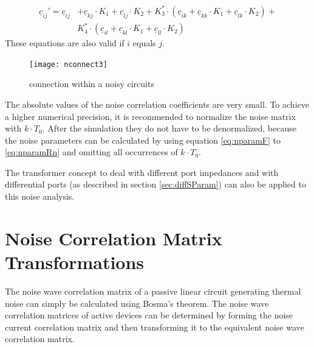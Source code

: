 \begin{equation}
\begin{split}
\underline{c}_{ij}' = \underline{c}_{ij} &+ \underline{c}_{kj}\cdot K_1 + \underline{c}_{lj}\cdot K_2
   + K_3^*\cdot(\underline{c}_{ik} + \underline{c}_{kk}\cdot K_1 + \underline{c}_{lk}\cdot K_2) + \\
    &K_4^*\cdot(\underline{c}_{il} + \underline{c}_{kl}\cdot K_1 + \underline{c}_{ll}\cdot K_2)
\end{split}
\end{equation}
These equations are also valid if $i$ equals $j$.

\begin{figure}[ht]
\begin{center}
\texttt{[image: nconnect3]}
\end{center}
\caption{connection within a noisy circuits}
\label{fig:nconnect3}
\end{figure}
\FloatBarrier

The absolute values of the noise correlation coefficients are very
small.  To achieve a higher numerical precision, it is recommended to
normalize the noise matrix with $k\cdot T_0$. After the simulation
they do not have to be denormalized, because the noise parameters can
be calculated by using equation \eqref{eq:nparamF} to
\eqref{eq:nparamRn} and omitting all occurrences of $k\cdot T_0$.

\addvspace{12pt}

The transformer concept to deal with different port impedances and
with differential ports (as described in section \ref{sec:diffSParam})
can also be applied to this noise analysis.


\section{Noise Correlation Matrix Transformations}

The noise wave correlation matrix of a passive linear circuit
generating thermal noise can simply be calculated using Bosma's theorem.
The noise wave correlation matrices of active devices can be
determined by forming the noise current correlation matrix and then
transforming it to the equivalent noise wave correlation matrix.

\addvspace{12pt}


